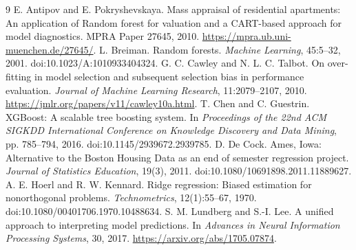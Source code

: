 \documentclass{sigkddExp}
\begin{document}
\begin{thebibliography}{9}
 E. Antipov and E. Pokryshevskaya. Mass appraisal of residential apartments: An application of Random forest for valuation and a CART-based approach for model diagnostics. MPRA Paper 27645, 2010. \url{https://mpra.ub.uni-muenchen.de/27645/}.
\balancecolumns
{} L. Breiman. Random forests. \emph{Machine Learning}, 45:5--32, 2001. doi:10.1023/A:1010933404324.
 G. C. Cawley and N. L. C. Talbot. On over-fitting in model selection and subsequent selection bias in performance evaluation. \emph{Journal of Machine Learning Research}, 11:2079--2107, 2010. \url{https://jmlr.org/papers/v11/cawley10a.html}.
 T. Chen and C. Guestrin. XGBoost: A scalable tree boosting system. In \emph{Proceedings of the 22nd ACM SIGKDD International Conference on Knowledge Discovery and Data Mining}, pp. 785--794, 2016. doi:10.1145/2939672.2939785.
 D. De Cock. Ames, Iowa: Alternative to the Boston Housing Data as an end of semester regression project. \emph{Journal of Statistics Education}, 19(3), 2011. doi:10.1080/10691898.2011.11889627.
 A. E. Hoerl and R. W. Kennard. Ridge regression: Biased estimation for nonorthogonal problems. \emph{Technometrics}, 12(1):55--67, 1970. doi:10.1080/00401706.1970.10488634.
 S. M. Lundberg and S.-I. Lee. A unified approach to interpreting model predictions. In \emph{Advances in Neural Information Processing Systems}, 30, 2017. \url{https://arxiv.org/abs/1705.07874}.
\end{thebibliography}
\end{document}
